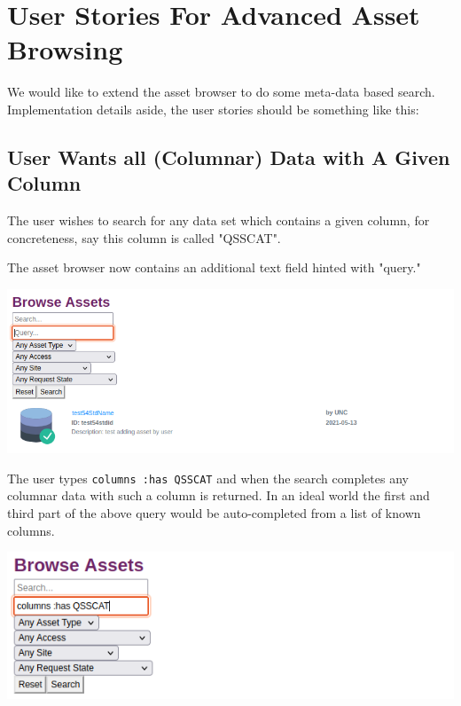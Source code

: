 \documentclass[11pt]{article}
\author{Vincent Toups}
\date{\today}
\title{}
\begin{document}
\tableofcontents

\section{User Stories For Advanced Asset Browsing}
\label{sec:orgc5f3fa3}

We would like to extend the asset browser to do some meta-data based
search. Implementation details aside, the user stories should be
something like this:

\subsection{User Wants all (Columnar) Data with A Given Column}
\label{sec:orgf075a22}

The user wishes to search for any data set which contains a given
column, for concreteness, say this column is called "QSSCAT".

The asset browser now contains an additional text field hinted with
"query."

\begin{center}
\includegraphics[width=.9\linewidth]{./new-search-box.png}
\end{center}

The user types \texttt{columns :has QSSCAT} and when the search completes any
columnar data with such a column is returned.  In an ideal world the
first and third part of the above query would be auto-completed from a
list of known columns.

\begin{center}
\includegraphics[width=.9\linewidth]{./simple-query.png}
\end{center}
\end{document}

